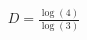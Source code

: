 \documentclass[preview]{standalone}
\begin{document}
\begin{align*}
D = \frac{\log(4)}{\log(3)}
\end{align*}
\end{document}
